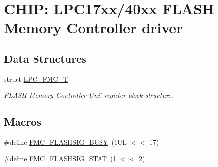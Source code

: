 \hypertarget{group__FMC__17XX__40XX}{\section{C\-H\-I\-P\-: L\-P\-C17xx/40xx F\-L\-A\-S\-H Memory Controller driver}
\label{group__FMC__17XX__40XX}
}
\subsection*{Data Structures}
\begin{DoxyCompactItemize}
\item 
struct \hyperlink{structLPC__FMC__T}{L\-P\-C\-\_\-\-F\-M\-C\-\_\-\-T}
\begin{DoxyCompactList}\small\item\em F\-L\-A\-S\-H Memory Controller Unit register block structure. \end{DoxyCompactList}\end{DoxyCompactItemize}
\subsection*{Macros}
\begin{DoxyCompactItemize}
\item 
\#define \hyperlink{group__FMC__17XX__40XX_ga1c732efb3127d9e699c46b4a89706639}{F\-M\-C\-\_\-\-F\-L\-A\-S\-H\-S\-I\-G\-\_\-\-B\-U\-S\-Y}~(1\-U\-L $<$$<$ 17)
\item 
\#define \hyperlink{group__FMC__17XX__40XX_ga3d2c7a30422c68c08d48b4e4f03a2787}{F\-M\-C\-\_\-\-F\-L\-A\-S\-H\-S\-I\-G\-\_\-\-S\-T\-A\-T}~(1 $<$$<$ 2)
\end{DoxyCompactItemize}

